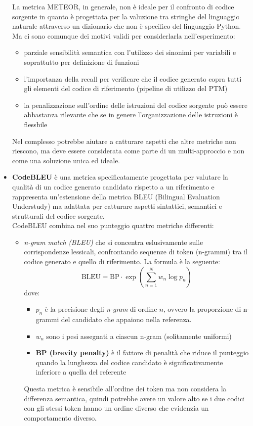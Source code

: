 \documentclass{article}
\begin{document}
\begin{itemize}
    La metrica METEOR, in generale, non è ideale per il confronto di codice sorgente in quanto è progettata per la valuzione tra stringhe del linguaggio naturale attraverso un dizionario che non è specifico del linguaggio Python. Ma ci sono comunque dei motivi validi per considerlarla nell'esperimento:
    \begin{itemize}
        \item parziale sensibilità semantica con l'utilizzo dei sinonimi per variabili e soprattutto per definizione di funzioni
        \item l'importanza della recall per verificare che il codice generato copra tutti gli elementi del codice di riferimento (pipeline di utilizzo del PTM)
        \item la penalizzazione sull'ordine delle istruzioni del codice sorgente può essere abbastanza rilevante che se in genere l'organizzazione delle istruzioni è flessbile
    \end{itemize}
    Nel complesso potrebbe aiutare a catturare aspetti che altre metriche non riescono, ma deve essere considerata come parte di un multi-approccio e non come una soluzione unica ed ideale.
    
    \item \textbf{CodeBLEU} \cite{ren2020codebleumethodautomaticevaluation} è una metrica specificatamente progettata per valutare la qualità di un codice generato candidato rispetto a un riferimento e rappresenta un'estensione della metrica BLEU (Bilingual Evaluation Understudy) \cite{10.3115/1073083.1073135} ma adattata per catturare aspetti sintattici, semantici e strutturali del codice sorgente.\\
    CodeBLEU combina nel suo punteggio quattro metriche differenti:
    \begin{itemize}
        \item \textit{n-gram match (BLEU)} che si concentra eslusivamente sulle corrispondenze lessicali, confrontando sequenze di token (n-grammi) tra il codice generato e quello di riferimento. La formula è la seguente:
        \[
            \text{BLEU} = \text{BP} \cdot \exp \left( \sum_{n=1}^{N} w_n \log p_n \right)
        \]
        dove:
        \begin{itemize}
            \item $p_n$ è la precisione degli \textit{n-gram} di ordine $n$, ovvero la proporzione di n-grammi del candidato che appaiono nella referenza.
            \item $w_n$ sono i pesi assegnati a ciascun n-gram (solitamente uniformi)
            \item \textbf{BP (brevity penalty)} è il fattore di penalità che riduce il punteggio quando la lunghezza del codice candidato è significativamente inferiore a quella del referente
        \end{itemize}
        Questa metrica è sensibile all'ordine dei token ma non considera la differenza semantica, quindi potrebbe avere un valore alto se i due codici con gli stessi token hanno un ordine diverso che evidenzia un comportamento diverso.


\end{itemize}
\end{itemize}
\end{document}
